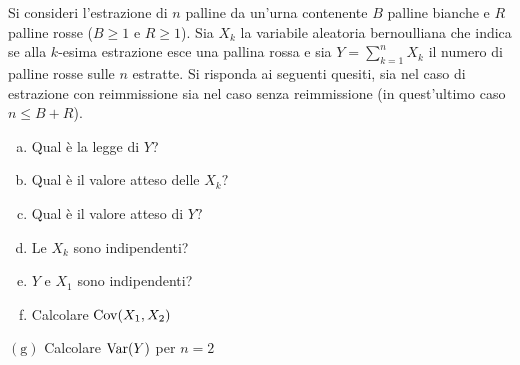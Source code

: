 Si consideri l'estrazione di $n$ palline da un'urna contenente $B$ palline bianche e $R$ palline rosse ($B\geq 1$ e $R\geq 1$). Sia $X_{k}$ la variabile aleatoria bernoulliana che indica se alla $k$-esima estrazione esce una pallina rossa e sia $Y=\sum_{k=1}^{n} X_{k}$ il numero di palline rosse sulle $n$ estratte. Si risponda ai seguenti quesiti, sia nel caso di estrazione con reimmissione sia nel caso senza reimmissione (in quest'ultimo caso $n\leq B+R$).
\begin{enumerate}[a)]
	\item Qual è la legge di $Y$?
	\item Qual è il valore atteso delle $X_{k} ?$
	\item Qual è il valore atteso di $Y?$
	\item Le $X_{k}$ sono indipendenti?
	\item $Y$ e $X_{1}$ sono indipendenti?
	\item Calcolare $\operatorname{Cov}(X_{1} ,X_{2})$
\end{enumerate}
$(\mathrm{g})$ Calcolare $\operatorname{Var} (Y)$ per $n=2$

\Esercizio{}

